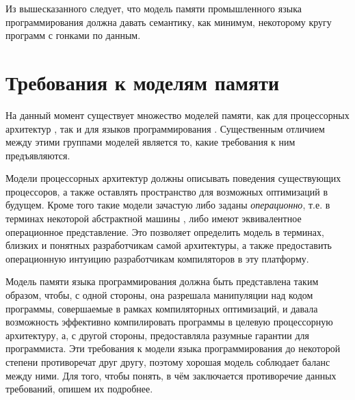 Из вышесказанного следует, что модель памяти промышленного языка программирования должна давать семантику,
как минимум, некоторому кругу программ с гонками по данным.

\section{Требования к моделям памяти}
На данный момент существует множество моделей памяти, как для процессорных архитектур
\cite{Sewell-al:CACM10,Alglave-al:TOPLAS14,Flur-al:POPL16,Pulte-al:POPL18,Sarkar-al:PLDI11,Kavanagh-Brookes:CoRR17},
так и для языков программирования
\cite{Crary-Sullivan:POPL15,Lamport:TC79,Boudol-al:EXPRESS12,Boudol-Petri:POPL09,PichonPharabod-Sewell:POPL16,Jeffrey-Riely:LICS16,
Nienhuis-al:OOPSLA16,Batty-al:POPL11,Manson-al:POPL05}.
Существенным отличием между этими группами моделей является то, какие требования к ним предъявляются.

Модели процессорных архитектур должны описывать поведения существующих процессоров, а также оставлять пространство
для возможных оптимизаций в будущем.
Кроме того такие модели зачастую либо заданы \emph{операционно}, т.е. в терминах некоторой
абстрактной машины \cite{Diehl-al:FGCS00}, либо имеют эквивалентное операционное представление.
Это позволяет определить модель в терминах, близких и понятных разработчикам самой архитектуры, а также предоставить
операционную интуицию разработчикам компиляторов в эту платформу.

Модель памяти языка программирования должна быть представлена таким образом, чтобы, с одной стороны,
она разрешала манипуляции над кодом программы, совершаемые в рамках компиляторных оптимизаций, и давала возможность
эффективно компилировать программы в целевую процессорную архитектуру, а, с другой стороны, предоставляла
разумные гарантии для программиста.
Эти требования к модели языка программирования до некоторой степени противоречат друг другу, поэтому хорошая модель
соблюдает баланс между ними.
Для того, чтобы понять, в чём заключается противоречие данных требований, опишем их подробнее.

